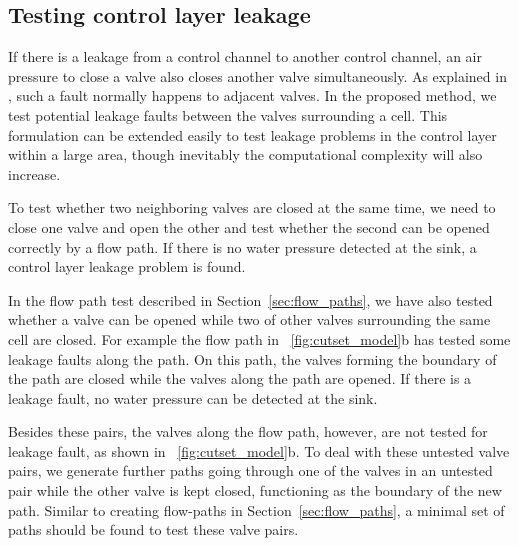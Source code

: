
\subsection{Testing control layer leakage}

If there is a leakage from a control channel to another control channel,
an air pressure to close a valve also closes another valve simultaneously. 
As explained in \cite{HuYHC14}, such a fault normally happens to adjacent valves.
In the proposed method, we test potential leakage faults between the valves
surrounding a cell. This formulation can be extended easily to test leakage
problems in the control layer within a large area, though inevitably the
computational complexity will also increase.

To test whether two neighboring valves are closed at the same time, we 
need to close one valve and open the other and test whether the second can be
opened correctly by a flow path. If there is no water pressure detected at the sink, 
a control layer leakage problem is found.

In the flow path test described in Section~\ref{sec:flow_paths}, 
we have also tested whether a valve can be opened while two of other valves surrounding 
the same cell are closed. For example
the flow path in \figname~\ref{fig:cutset_model}b has tested some leakage
faults along the path. 
On this path, the valves forming the boundary of the path are closed while the
valves along the path are opened. If there is a leakage fault, no water
pressure can be detected at the sink. 


Besides these pairs, the valves along the flow path, however, are not tested
for leakage fault, as shown in \figname~\ref{fig:cutset_model}b.
To deal with these untested valve pairs, we generate further paths going through
one of the valves in an untested pair while the other valve is kept closed, 
functioning as the boundary of the new path. Similar to creating 
flow-paths in Section~\ref{sec:flow_paths}, 
a minimal set of paths should be found to test these valve pairs.

